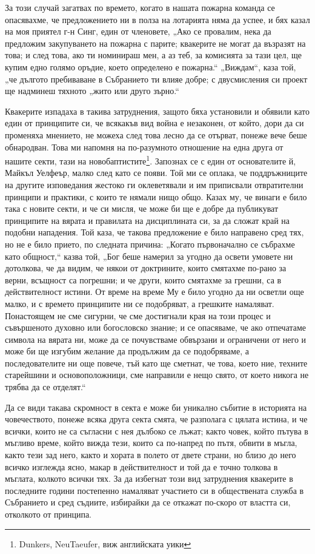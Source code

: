 \documentclass[12pt]{book}
\begin{document}
За този случай загатвах по времето, когато в нашата пожарна команда се опасявахме, че предложението ни в полза на лотарията няма да успее, и бях казал на моя приятел г-н Синг, един от членовете, „Ако се провалим, нека да предложим закупуването на пожарна с парите; квакерите не могат да възразят на това; и след това, ако ти номинираш мен, а аз теб, за комисията за тази цел, ще купим едно голямо оръдие, което определено е пожарна.“ „Виждам“, каза той, „че дългото пребиваване в Събранието ти влияе добре; с двусмисления си проект ще надминеш тяхното „жито или друго зърно.“ 

Квакерите изпадаха в такива затруднения, защото бяха установили и обявили като един от принципите си, че всякакъв вид война е незаконен, от който, дори да си променяха мнението, не можеха след това лесно да се отърват, понеже вече беше обнародван. Това ми напомня на по-разумното отношение на една друга от нашите секти, тази на новобаптистите\footnote{Dunkers, NeuTaeufer, виж английската уики}. Запознах се с един от основателите й, Майкъл Уелфеър, малко след като се появи. Той ми се оплака, че поддръжниците на другите изповедания жестоко ги оклеветявали и им приписвали отвратителни принципи и практики, с които те нямали нищо общо. Казах му, че винаги е било така с новите секти, и че си мисля, че може би ще е добре да публикуват принципите на вярата и правилата на дисциплината си, за да сложат край на подобни нападения. Той каза, че такова предложение е било направено сред тях, но не е било прието, по следната причина: „Когато първоначално се събрахме като общност,“ казва той, „Бог беше намерил за угодно да освети умовете ни дотолкова, че да видим, че някои от доктрините, които смятахме по-рано за верни, всъщност са погрешни; и че други, които смятахме за грешни, са в действителност истини. От време на време Му е било угодно да ни осветли още малко, и с времето принципите ни се подобряват, а грешките намаляват. Понастоящем не сме сигурни, че сме достигнали края на този процес и съвършеното духовно или богословско знание; и се опасяваме, че ако отпечатаме символа на вярата ни, може да се почувстваме обвързани и ограничени от него и може би ще изгубим желание да продължим да се подобряваме, а последователите ни още повече, тъй като ще сметнат, че това, което ние, техните старейшини и основоположници, сме направили е нещо свято, от което никога не трябва да се отделят.“

Да се види такава скромност в секта е може би уникално събитие в историята на човечеството, понеже всяка друга секта смята, че разполага с цялата истина, и че всички, които не са съгласни с нея дълбоко се лъжат; както човек, който пътува в мъгливо време, който вижда тези, които са по-напред по пътя, обвити в мъгла, както тези зад него, както и хората в полето от двете страни, но близо до него всичко изглежда ясно, макар в действителност и той да е точно толкова в мъглата, колкото всички тях. За да избегнат този вид затруднения квакерите в последните години постепенно намаляват участието си в обществената служба в Събранието и сред съдиите, избирайки да се откажат по-скоро от властта си, отколкото от принципа.
\end{document}
